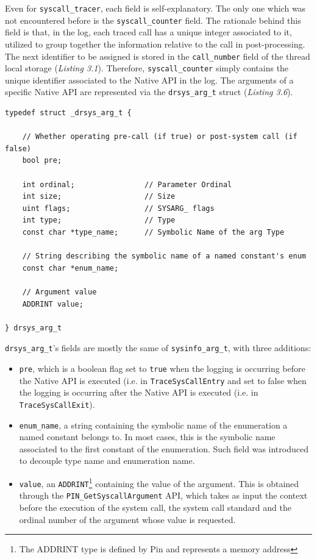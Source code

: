 Even for \texttt{syscall\_tracer}, each field is self-explanatory. The only one which was not encountered before is the \texttt{syscall\_counter} field. The rationale behind this field is that, in the log, each traced call has a unique integer associated to it, utilized to group together the information relative to the call in post-processing. The next identifier to be assigned is stored in the \texttt{call\_number} field of the thread local storage (\textit{Listing 3.1}). Therefore, \texttt{syscall\_counter} simply contains the unique identifier associated to the Native API in the log. The arguments of a specific Native API are represented via the \texttt{drsys\_arg\_t} struct (\textit{Listing 3.6}).
\\
\begin{lstlisting}[caption={\texttt{struct} representing the an argument of the Native API being traced},captionpos=b]
typedef struct _drsys_arg_t {

	// Whether operating pre-call (if true) or post-system call (if false)
	bool pre;

	int ordinal;			    // Parameter Ordinal				
	int size;			        // Size	
	uint flags;			        // SYSARG_ flags
	int type;			        // Type
	const char *type_name;		// Symbolic Name of the arg Type

	// String describing the symbolic name of a named constant's enum
	const char *enum_name;

	// Argument value
	ADDRINT value;
	
} drsys_arg_t
\end{lstlisting}

\texttt{drsys\_arg\_t}'s fields are mostly the same of \texttt{sysinfo\_arg\_t}, with three additions:
\begin{itemize}
\item \texttt{pre}, which is a boolean flag set to \texttt{true} when the logging is occurring before the Native API is executed (i.e. in \texttt{TraceSysCallEntry} and set to false when the logging is occurring after the Native API is executed (i.e. in \texttt{TraceSysCallExit}).
\item \texttt{enum\_name}, a string containing the symbolic name of the enumeration a named constant belongs to. In most cases, this is the symbolic name associated to the first constant of the enumeration. Such field was introduced to decouple type name and enumeration name.
\item \texttt{value}, an \texttt{ADDRINT}\footnote{The ADDRINT type is defined by Pin and represents a memory address} containing the value of the argument. This is obtained through the \texttt{PIN\_GetSyscallArgument} API, which takes as input the context before the execution of the system call, the system call standard and the ordinal number of the argument whose value is requested.  
\end{itemize}

